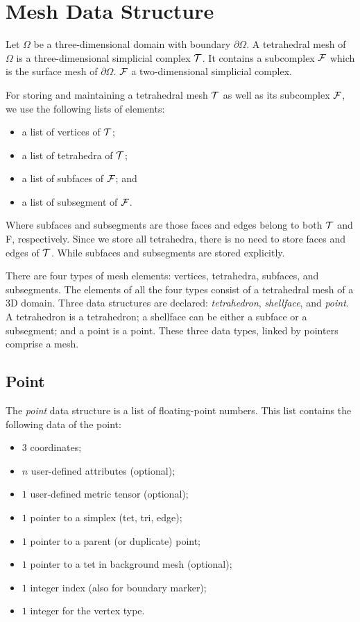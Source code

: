 \chapter{Mesh Data Structure}
\label{chap:meshds}

Let $\Omega$ be a three-dimensional domain with boundary $\partial\Omega$. A tetrahedral mesh of $\Omega$ is a three-dimensional simplicial complex ${\cal T}$. It contains a subcomplex ${\cal F}$ which is the surface mesh of $\partial\Omega$. ${\cal F}$ a two-dimensional simplicial complex.

For storing and maintaining a tetrahedral mesh ${\cal T}$ as well as its subcomplex ${\cal F}$, we use the following lists of elements:
\begin{itemize}
\item a list of vertices of ${\cal T}$;
\item a list of tetrahedra of ${\cal T}$;
\item a list of subfaces of ${\cal F}$; and
\item a list of subsegment of ${\cal F}$.
\end{itemize}
Where subfaces and subsegments are those faces and edges belong to both ${\cal T}$ and {\cal F}, respectively. Since we store all tetrahedra, there is no need to store faces and edges of ${\cal T}$. While subfaces and subsegments are stored explicitly. 

There are four types of mesh elements: vertices, tetrahedra, subfaces, and subsegments. The elements of all the four types consist of a tetrahedral mesh of a 3D domain.  Three data structures are declared:  {\it tetrahedron}, {\it shellface}, and {\it point}. A tetrahedron is a tetrahedron;  a shellface can be either a subface or a subsegment;  and a point is a point. These three data types, linked by pointers comprise a mesh.

\section{Point}

The {\it point} data structure is a list of floating-point numbers. This list contains the following data of the point:
\begin{itemize}
\item $3$ coordinates;
\item $n$ user-defined attributes (optional);
\item $1$ user-defined metric tensor (optional);
\item $1$ pointer to a simplex (tet, tri, edge); 
\item $1$ pointer to a parent (or duplicate) point;
\item $1$ pointer to a tet in background mesh (optional);
\item $1$ integer index (also for boundary marker);
\item $1$ integer for the vertex type.
\end{itemize}

